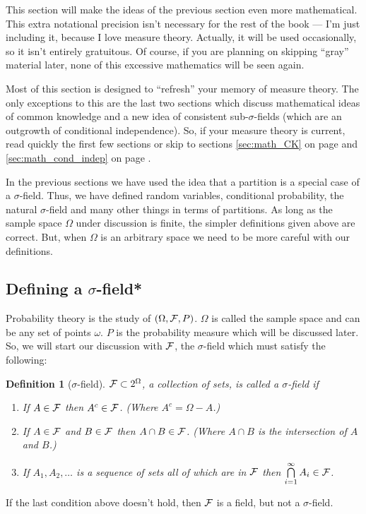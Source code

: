 \documentclass[14pt]{extarticle}
\newtheorem{definition}{Definition}
\begin{document}
%
This section will make the ideas of the previous section even more
mathematical.  This extra notational precision isn't necessary for the
rest of the book --- I'm just including it, because I love measure theory.
Actually, it will be used occasionally, so it isn't entirely
gratuitous.  Of course, if you are planning on skipping ``gray''
material later, none of this excessive mathematics will be seen again.

Most of this section is designed to ``refresh'' your memory of measure
theory.    The only exceptions to
this are the last two sections which discuss mathematical ideas of common
knowledge and a new idea of consistent sub-$\sigma$-fields (which are
an outgrowth of conditional independence).  So, if your measure theory
is current, read quickly the first few sections or skip to sections
\ref{sec:math_CK} on page \pageref{sec:math_CK} and
\ref{sec:math_cond_indep} on page \pageref{sec:math_cond_indep}.

In the previous sections we have used the idea that a partition is a
special case of a $\sigma$-field.  Thus, we have defined random
variables, conditional probability, the natural $\sigma$-field and
many other things in terms of partitions.  As long as the sample space
$\Omega$ under discussion is finite, the simpler definitions given
above are correct.  But, when $\Omega$ is an arbitrary space we need
to be more careful with our definitions.
 
        \subsection{Defining a $\sigma$-field*}
%
        Probability theory is the study of $(\Omega,{\cal F},P)$.
        $\Omega$ is called the sample space and can be any set of
        points $\omega$. $P$ is the probability measure which will be
        discussed later.  So, we will start our discussion with ${\cal
          F}$, the $\sigma$-field which must satisfy the following:
\begin{definition}[$\sigma$-field] \label{def:sigma_field} ${\cal F}
  \subset 2^\Omega$, a collection of sets, is called a $\sigma$-field if
  \begin{enumerate}
  \item If $A \in {\cal F}$ then  $A^c \in {\cal F}$. (Where $A^c =
    \Omega - A$.) 
  \item If $A \in {\cal F}$ and $B \in {\cal F}$ then  $A \cap B \in
    {\cal F}$. (Where $A \cap B$ is the intersection of $A$ and $B$.) 
  \item If $A_1, A_2, \ldots$ is a sequence of sets all of which are
    in ${\cal F}$ then $\bigcap\limits_{i=1}^{\infty} A_i \in {\cal F}$.
\end{enumerate}
\end{definition}
If the last condition above doesn't hold, then ${\cal F}$ is a field,
but not a $\sigma$-field.
\end{document}
